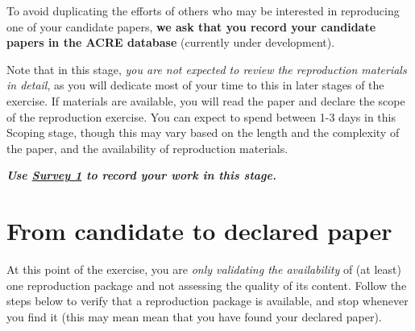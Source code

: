 \documentclass[]{book}
\begin{document}
To avoid duplicating the efforts of others who may be interested in reproducing one of your candidate papers, \textbf{we ask that you record your candidate papers in the ACRE database} (currently under development).

Note that in this stage, \emph{you are not expected to review the reproduction materials in detail}, as you will dedicate most of your time to this in later stages of the exercise. If materials are available, you will read the paper and declare the scope of the reproduction exercise. You can expect to spend between 1-3 days in this Scoping stage, though this may vary based on the length and the complexity of the paper, and the availability of reproduction materials.

\textbf{\emph{Use \href{https://berkeley.qualtrics.com/jfe/form/SV_2bO83uJvU9ZiTXv}{Survey 1} to record your work in this stage.}}

\hypertarget{from-candidate-to-declared-paper}{%
\section{From candidate to declared paper}\label{from-candidate-to-declared-paper}}

At this point of the exercise, you are \emph{only validating the availability} of (at least) one reproduction package and not assessing the quality of its content. Follow the steps below to verify that a reproduction package is available, and stop whenever you find it (this may mean mean that you have found your declared paper).
\end{document}
